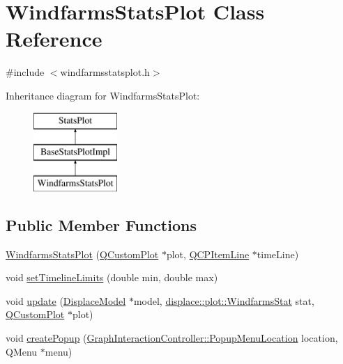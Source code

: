 \hypertarget{class_windfarms_stats_plot}{}\section{Windfarms\+Stats\+Plot Class Reference}
\label{class_windfarms_stats_plot}


{\ttfamily \#include $<$windfarmsstatsplot.\+h$>$}

Inheritance diagram for Windfarms\+Stats\+Plot\+:\begin{figure}[H]
\begin{center}
\leavevmode
\includegraphics[height=3.000000cm]{dc/db0/class_windfarms_stats_plot}
\end{center}
\end{figure}
\subsection*{Public Member Functions}
\begin{DoxyCompactItemize}
\item 
\mbox{\hyperlink{class_windfarms_stats_plot_a5b9f0d5bb65f52fd4f38acbdbef508be}{Windfarms\+Stats\+Plot}} (\mbox{\hyperlink{class_q_custom_plot}{Q\+Custom\+Plot}} $\ast$plot, \mbox{\hyperlink{class_q_c_p_item_line}{Q\+C\+P\+Item\+Line}} $\ast$time\+Line)
\item 
void \mbox{\hyperlink{class_windfarms_stats_plot_ac6cbcaa88f3834d6ec3035bdb03c8d49}{set\+Timeline\+Limits}} (double min, double max)
\item 
void \mbox{\hyperlink{class_windfarms_stats_plot_ab5c039952a27d958c13990e47753c602}{update}} (\mbox{\hyperlink{class_displace_model}{Displace\+Model}} $\ast$model, \mbox{\hyperlink{namespacedisplace_1_1plot_a8b9bfd155809bb203b09c572304a62c3}{displace\+::plot\+::\+Windfarms\+Stat}} stat, \mbox{\hyperlink{class_q_custom_plot}{Q\+Custom\+Plot}} $\ast$plot)
\item 
void \mbox{\hyperlink{class_windfarms_stats_plot_a4298f28b66931c4611562601d754fb7b}{create\+Popup}} (\mbox{\hyperlink{class_graph_interaction_controller_a67e6eba082927bf2b984bed54fe32764}{Graph\+Interaction\+Controller\+::\+Popup\+Menu\+Location}} location, Q\+Menu $\ast$menu)
\end{DoxyCompactItemize}

